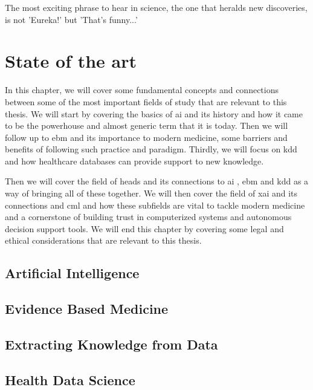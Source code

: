 \begin{savequote}[75mm]
The most exciting phrase to hear in science, the one that heralds new discoveries, is not 'Eureka!' but 'That's funny...'
\end{savequote}
\chapter{State of the art} \label{chap:sota}


In this chapter, we will cover some fundamental concepts and connections between some of the most important fields of study that are relevant to this thesis. We will start by covering the basics of \ac{ai} and its history and how it came to be the powerhouse and almost generic term that it is today. Then we will follow up to \ac{ebm} and its importance to modern medicine, some barriers and benefits of following such practice and paradigm. Thirdly, we will focus on \ac{kdd} and how healthcare databases can provide support to new knowledge.

Then we will cover the field of \ac{heads} and its connections to \ac{ai} , \ac{ebm} and \ac{kdd} as a way of bringing all of these together. We will then cover the field of \ac{xai} and its connections and \ac{cml} and how these subfields are vital to tackle modern medicine and a cornerstone of building trust in computerized systems and autonomous decision support tools. We will end this chapter by covering some legal and ethical considerations that are relevant to this thesis.


\section{Artificial Intelligence}


\section{Evidence Based Medicine}\label{subsec:ebm}




\section{Extracting Knowledge from Data}\label{sec:kdd}



\section{Health Data Science}

